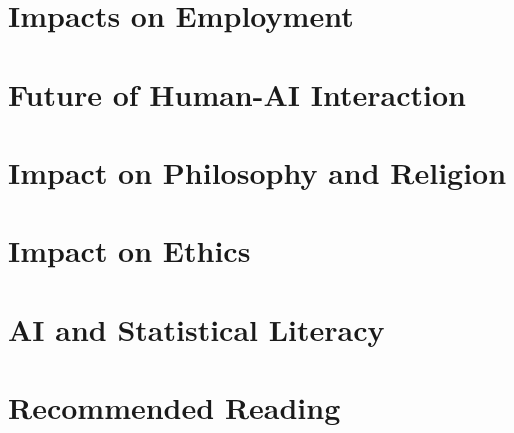 \documentclass{beamer}
\begin{document}
  \section{Impacts on Employment}
  \section{Future of Human-AI Interaction}
  \section{Impact on Philosophy and Religion}
  \section{Impact on Ethics}
  \section{AI and Statistical Literacy}
  \section{Recommended Reading}
  
\end{document}
